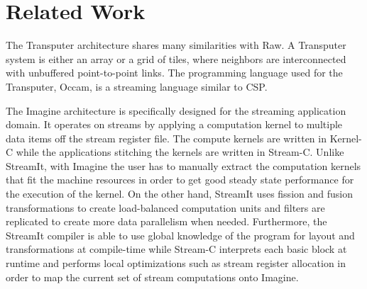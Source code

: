 \section{Related Work}
\label{sec:related}

The Transputer architecture shares many similarities with Raw.  A
Transputer system is either an array or a grid of tiles, where
neighbors are interconnected with unbuffered point-to-point links. The
programming language used for the Transputer, Occam, is a streaming
language similar to CSP.

The Imagine architecture is specifically designed for the streaming
application domain.  It operates on streams by applying a computation
kernel to multiple data items off the stream register file.  The
compute kernels are written in Kernel-C while the applications
stitching the kernels are written in Stream-C.  Unlike StreamIt, with
Imagine the user has to manually extract the computation kernels that
fit the machine resources in order to get good steady state
performance for the execution of the kernel.  On the other hand,
StreamIt uses fission and fusion transformations to create
load-balanced computation units and filters are replicated to create
more data parallelism when needed.  Furthermore, the StreamIt compiler
is able to use global knowledge of the program for layout and
transformations at compile-time while Stream-C interprets each basic
block at runtime and performs local optimizations such as stream
register allocation in order to map the current set of stream
computations onto Imagine.

